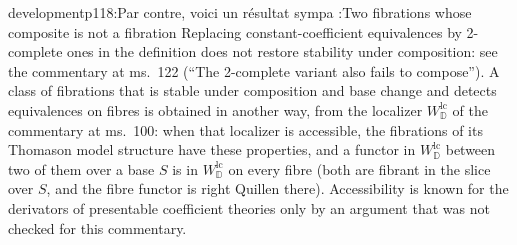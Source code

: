 \begin{dcomment}{development}{p118:Par contre, voici un résultat sympa :}{Two fibrations whose composite is not a fibration}
Replacing constant-coefficient equivalences by 2-complete ones in the definition does not restore stability under composition: see the commentary at ms.~122 (``The 2-complete variant also fails to compose''). A class of fibrations that is stable under composition and base change and detects equivalences on fibres is obtained in another way, from the localizer $W^{\mathrm{lc}}_{\mathbb D}$ of the commentary at ms.~100: when that localizer is accessible, the fibrations of its Thomason model structure \citep[Th\'eor\`eme~5.2.15]{Cisinski2006} have these properties, and a functor in $W^{\mathrm{lc}}_{\mathbb D}$ between two of them over a base $S$ is in $W^{\mathrm{lc}}_{\mathbb D}$ on every fibre (both are fibrant in the slice over $S$, and the fibre functor is right Quillen there). Accessibility is known for the derivators of presentable coefficient theories only by an argument that was not checked for this commentary.
\end{dcomment}

